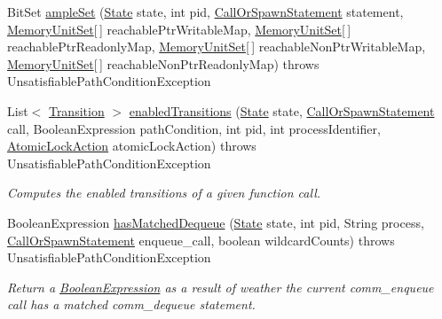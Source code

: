 \begin{DoxyCompactItemize}
\item 
Bit\+Set \hyperlink{classedu_1_1udel_1_1cis_1_1vsl_1_1civl_1_1library_1_1comm_1_1LibcommEnabler_aa852877b6bb359a28e14c6a13956c7c1}{ample\+Set} (\hyperlink{interfaceedu_1_1udel_1_1cis_1_1vsl_1_1civl_1_1state_1_1IF_1_1State}{State} state, int pid, \hyperlink{interfaceedu_1_1udel_1_1cis_1_1vsl_1_1civl_1_1model_1_1IF_1_1statement_1_1CallOrSpawnStatement}{Call\+Or\+Spawn\+Statement} statement, \hyperlink{interfaceedu_1_1udel_1_1cis_1_1vsl_1_1civl_1_1state_1_1IF_1_1MemoryUnitSet}{Memory\+Unit\+Set}\mbox{[}$\,$\mbox{]} reachable\+Ptr\+Writable\+Map, \hyperlink{interfaceedu_1_1udel_1_1cis_1_1vsl_1_1civl_1_1state_1_1IF_1_1MemoryUnitSet}{Memory\+Unit\+Set}\mbox{[}$\,$\mbox{]} reachable\+Ptr\+Readonly\+Map, \hyperlink{interfaceedu_1_1udel_1_1cis_1_1vsl_1_1civl_1_1state_1_1IF_1_1MemoryUnitSet}{Memory\+Unit\+Set}\mbox{[}$\,$\mbox{]} reachable\+Non\+Ptr\+Writable\+Map, \hyperlink{interfaceedu_1_1udel_1_1cis_1_1vsl_1_1civl_1_1state_1_1IF_1_1MemoryUnitSet}{Memory\+Unit\+Set}\mbox{[}$\,$\mbox{]} reachable\+Non\+Ptr\+Readonly\+Map)  throws Unsatisfiable\+Path\+Condition\+Exception 
\item 
List$<$ \hyperlink{interfaceedu_1_1udel_1_1cis_1_1vsl_1_1civl_1_1semantics_1_1IF_1_1Transition}{Transition} $>$ \hyperlink{classedu_1_1udel_1_1cis_1_1vsl_1_1civl_1_1library_1_1comm_1_1LibcommEnabler_ad20e493e1e307fde6e554e028486b911}{enabled\+Transitions} (\hyperlink{interfaceedu_1_1udel_1_1cis_1_1vsl_1_1civl_1_1state_1_1IF_1_1State}{State} state, \hyperlink{interfaceedu_1_1udel_1_1cis_1_1vsl_1_1civl_1_1model_1_1IF_1_1statement_1_1CallOrSpawnStatement}{Call\+Or\+Spawn\+Statement} call, Boolean\+Expression path\+Condition, int pid, int process\+Identifier, \hyperlink{enumedu_1_1udel_1_1cis_1_1vsl_1_1civl_1_1semantics_1_1IF_1_1Transition_1_1AtomicLockAction}{Atomic\+Lock\+Action} atomic\+Lock\+Action)  throws Unsatisfiable\+Path\+Condition\+Exception 
\begin{DoxyCompactList}\small\item\em Computes the enabled transitions of a given function call. \end{DoxyCompactList}\item 
Boolean\+Expression \hyperlink{classedu_1_1udel_1_1cis_1_1vsl_1_1civl_1_1library_1_1comm_1_1LibcommEnabler_a32fcd61947da6d8cb62563a58304dfec}{has\+Matched\+Dequeue} (\hyperlink{interfaceedu_1_1udel_1_1cis_1_1vsl_1_1civl_1_1state_1_1IF_1_1State}{State} state, int pid, String process, \hyperlink{interfaceedu_1_1udel_1_1cis_1_1vsl_1_1civl_1_1model_1_1IF_1_1statement_1_1CallOrSpawnStatement}{Call\+Or\+Spawn\+Statement} enqueue\+\_\+call, boolean wildcard\+Counts)  throws Unsatisfiable\+Path\+Condition\+Exception 
\begin{DoxyCompactList}\small\item\em Return a \hyperlink{}{Boolean\+Expression} as a result of weather the current {\ttfamily comm\+\_\+enqueue} call has a matched {\ttfamily comm\+\_\+dequeue} statement. \end{DoxyCompactList}\end{DoxyCompactItemize}
